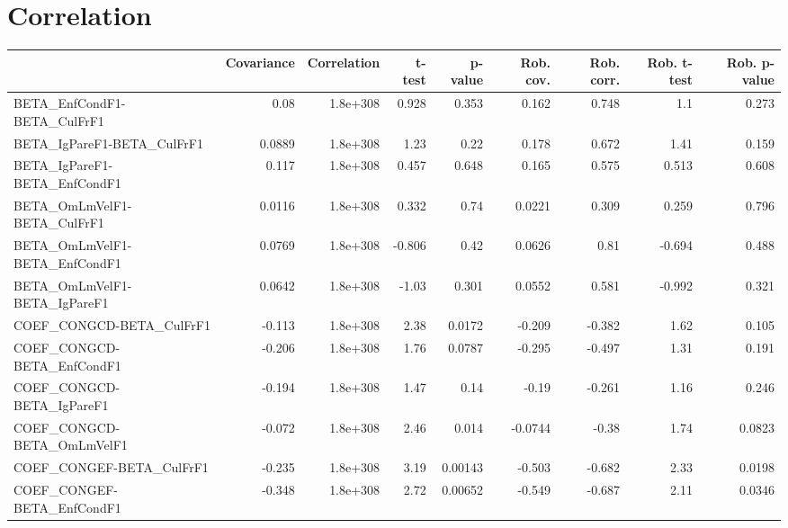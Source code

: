 \section{Correlation}
\begin{tabular}{lrrrrrrrr}
\toprule
{} &  Covariance &  Correlation &   t-test &  p-value &  Rob. cov. &  Rob. corr. &  Rob. t-test &  Rob. p-value \\
\midrule
BETA\_EnfCondF1-BETA\_CulFrF1           &        0.08 &     1.8e+308 &    0.928 &    0.353 &      0.162 &       0.748 &          1.1 &         0.273 \\
BETA\_IgPareF1-BETA\_CulFrF1            &      0.0889 &     1.8e+308 &     1.23 &     0.22 &      0.178 &       0.672 &         1.41 &         0.159 \\
BETA\_IgPareF1-BETA\_EnfCondF1          &       0.117 &     1.8e+308 &    0.457 &    0.648 &      0.165 &       0.575 &        0.513 &         0.608 \\
BETA\_OmLmVelF1-BETA\_CulFrF1           &      0.0116 &     1.8e+308 &    0.332 &     0.74 &     0.0221 &       0.309 &        0.259 &         0.796 \\
BETA\_OmLmVelF1-BETA\_EnfCondF1         &      0.0769 &     1.8e+308 &   -0.806 &     0.42 &     0.0626 &        0.81 &       -0.694 &         0.488 \\
BETA\_OmLmVelF1-BETA\_IgPareF1          &      0.0642 &     1.8e+308 &    -1.03 &    0.301 &     0.0552 &       0.581 &       -0.992 &         0.321 \\
COEF\_CONGCD-BETA\_CulFrF1              &      -0.113 &     1.8e+308 &     2.38 &   0.0172 &     -0.209 &      -0.382 &         1.62 &         0.105 \\
COEF\_CONGCD-BETA\_EnfCondF1            &      -0.206 &     1.8e+308 &     1.76 &   0.0787 &     -0.295 &      -0.497 &         1.31 &         0.191 \\
COEF\_CONGCD-BETA\_IgPareF1             &      -0.194 &     1.8e+308 &     1.47 &     0.14 &      -0.19 &      -0.261 &         1.16 &         0.246 \\
COEF\_CONGCD-BETA\_OmLmVelF1            &      -0.072 &     1.8e+308 &     2.46 &    0.014 &    -0.0744 &       -0.38 &         1.74 &        0.0823 \\
COEF\_CONGEF-BETA\_CulFrF1              &      -0.235 &     1.8e+308 &     3.19 &  0.00143 &     -0.503 &      -0.682 &         2.33 &        0.0198 \\
COEF\_CONGEF-BETA\_EnfCondF1            &      -0.348 &     1.8e+308 &     2.72 &  0.00652 &     -0.549 &      -0.687 &         2.11 &        0.0346 \\

\end{tabular}
